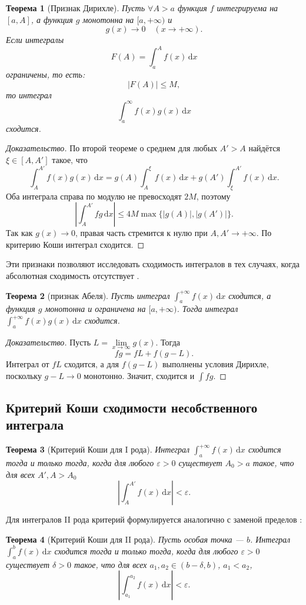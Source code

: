 \documentclass[coursework, och, times]{SCWorks1}
\newtheorem{theorem}{Теорема}
\newcommand{\dd}{\,\mathrm{d}}
\newcommand{\eps}{\varepsilon}
\renewcommand{\le}{\leqslant}
\begin{document}
\begin{theorem}[Признак Дирихле]
Пусть $\forall A > a$ функция \(f\) интегрируема на \([a, A] \), а функция \(g\) монотонна на \([a,+\infty)\) и
\[
g(x)\to0\quad (x\to+\infty).
\]
Если интегралы
\[
F(A)=\int_a^A f(x)\dd x
\]
ограничены, то есть:
\[
|F(A)|\le M,
\]
то интеграл
\[
\int_a^{\infty}f(x)g(x)\dd x
\]
сходится.
\end{theorem}
\begin{proof}[Доказательство]
По второй теореме о среднем для любых \(A'>A\) найдётся \(\xi\in[A,A']\) такое, что
\[
\int_A^{A'}f(x)g(x)\dd x
=
g(A)\int_A^\xi f(x)\dd x
+
g(A')\int_\xi^{A'}f(x)\dd x.
\]
Оба интеграла справа по модулю не превосходят \(2M\), поэтому
\[
\left|\int_A^{A'}f g\dd x\right|
\le 4M\max\{|g(A)|,|g(A')|\}.
\]
Так как \(g(x)\to0\), правая часть стремится к нулю при \(A,A'\to+\infty\). По критерию Коши интеграл сходится.
\end{proof}
Эти признаки позволяют исследовать сходимость интегралов в тех случаях, когда абсолютная сходимость отсутствует \cite{ilinpozniak}.
\begin{theorem}[признак Абеля]\label{th:Abel}
Пусть интеграл $\int_a^{+\infty}f(x)\dd x$ сходится, а функция $g$ монотонна и ограничена на $[a,+\infty)$. Тогда интеграл $\int_a^{+\infty}f(x)g(x)\dd x$ сходится.
\end{theorem}
\begin{proof}[Доказательство]
Пусть \(L=\lim\limits_{x\to\infty}g(x)\). Тогда
\[
fg=fL+f(g-L).
\]
Интеграл от \(fL\) сходится, а для \(f(g-L)\) выполнены условия Дирихле, поскольку \(g-L\to0\) монотонно. Значит, сходится и \(\int fg\).
\end{proof}

\subsection{Критерий Коши сходимости несобственного интеграла}\label{sec:Cauchy}

\begin{theorem}[Критерий Коши для I рода]
Интеграл \(\int_a^{+\infty}f(x)\dd x\) сходится тогда и только тогда, когда для любого \(\eps>0\) существует \(A_0>a\) такое, что для всех \(A',A>A_0\)
\[
\left|\int_A^{A'}f(x)\dd x\right|<\eps.
\]
\end{theorem}

Для интегралов II рода критерий формулируется аналогично с заменой пределов \cite{vinogradova}:
\begin{theorem}[Критерий Коши для II рода]
Пусть особая точка — \(b\). Интеграл \(\int_a^b f(x)\dd x\) сходится тогда и только тогда, когда для любого \(\eps>0\) существует \(\delta>0\) такое, что для всех \(a_1,a_2\in(b-\delta,b)\), \(a_1<a_2\),
\[
\left|\int_{a_1}^{a_2}f(x)\dd x\right|<\eps.
\]
\end{theorem}
\end{document}
